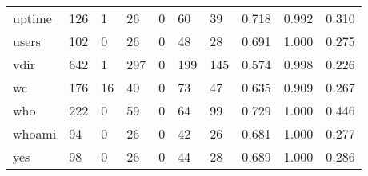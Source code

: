 \begin{longtable}{lp{2.0cm}p{2.0cm}p{2.0cm}p{2.0cm}p{2.0cm}p{2.0cm}p{2.0cm}p{2.0cm}p{2.0cm}}
uptime    &                    126 &                                  1 &                                26 &                                0 &                                60 &                              39 &                                0.718 &                                  0.992 &                                0.310 \\
users     &                    102 &                                  0 &                                26 &                                0 &                                48 &                              28 &                                0.691 &                                  1.000 &                                0.275 \\
vdir      &                    642 &                                  1 &                               297 &                                0 &                               199 &                             145 &                                0.574 &                                  0.998 &                                0.226 \\
wc        &                    176 &                                 16 &                                40 &                                0 &                                73 &                              47 &                                0.635 &                                  0.909 &                                0.267 \\
who       &                    222 &                                  0 &                                59 &                                0 &                                64 &                              99 &                                0.729 &                                  1.000 &                                0.446 \\
whoami    &                     94 &                                  0 &                                26 &                                0 &                                42 &                              26 &                                0.681 &                                  1.000 &                                0.277 \\
yes       &                     98 &                                  0 &                                26 &                                0 &                                44 &                              28 &                                0.689 &                                  1.000 &                                0.286 \\
\end{longtable}
